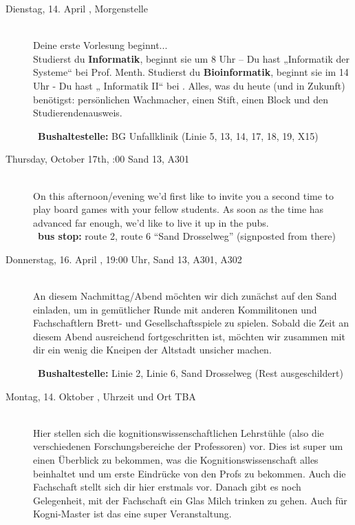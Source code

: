 \begin{description}
\ifbachelor
\item[Dienstag, 14. April \YEAR, Morgenstelle]\ \\
Deine erste Vorlesung beginnt... \\
Studierst du \textbf{Informatik}, beginnt sie um 8 Uhr -- Du hast „Informatik der Systeme“ bei Prof. Menth.
Studierst du \textbf{Bioinformatik}, beginnt sie im 14 Uhr - Du hast „ Informatik II“ bei \Infoprof.
Alles, was du heute (und in Zukunft) benötigst: persönlichen Wachmacher, einen Stift, einen Block und den Studierendenausweis.

~\textbf{Bushaltestelle:} BG Unfallklinik (Linie 5, 13, 14, 17, 18, 19, X15)
\fi

\ifml
    \item[Thursday, October 17th, \YEAR 18:00 Sand 13, A301]\ \\
        On this afternoon/evening we'd first like to invite you a second time to play board games with your fellow students. As soon as the time has advanced far enough, we'd like to live it up in the pubs.\\
	~\textbf{bus stop:} route 2, route 6 "`Sand Drosselweg"' (signposted from there)
\else
    \item[Donnerstag, 16. April \YEAR, 19:00 Uhr, Sand 13, A301, A302]\ \\
An diesem Nachmittag/Abend möchten wir dich zunächst auf den Sand einladen, um in gemütlicher Runde mit anderen Kommilitonen und Fachschaftlern Brett- und Gesellschaftsspiele zu spielen. Sobald die Zeit an diesem Abend ausreichend fortgeschritten ist, möchten wir zusammen mit dir ein wenig die Kneipen der Altstadt unsicher machen.

~\textbf{Bushaltestelle:} Linie 2, Linie 6, Sand Drosselweg (Rest ausgeschildert)
\fi



\ifkogwiss
\item[Montag, 14. Oktober \YEAR, Uhrzeit und Ort TBA]\ \\
    Hier stellen sich die kognitionswissenschaftlichen Lehrstühle (also die verschiedenen Forschungsbereiche der Professoren) vor. Dies ist super um einen Überblick zu bekommen, was die Kognitionswissenschaft alles beinhaltet und um erste Eindrücke von den Profs zu bekommen. Auch die Fachschaft stellt sich dir hier erstmals vor. Danach gibt es noch Gelegenheit, mit der Fachschaft ein Glas Milch trinken zu gehen. Auch für Kogni-Master ist das eine super Veranstaltung.
\fi




\end{description}
